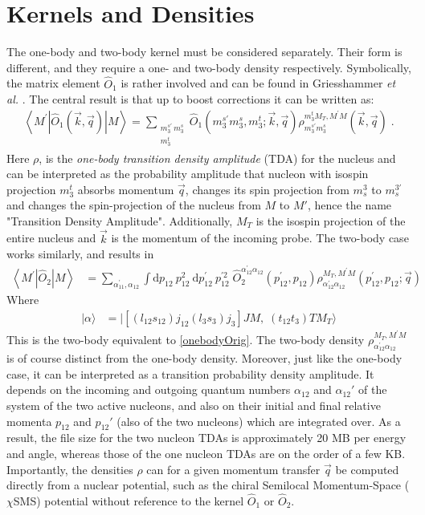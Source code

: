 \documentclass[a4paper,11pt]{article}
\newcommand{\etal}{\textit{et al.}}
\newcommand\bv[1]{\vec{#1}}
\begin{document}
\section{Kernels and Densities}
The one-body and two-body kernel must be considered separately.
Their form is different, and they require a one- and
two-body density respectively.
Symbolically, the matrix element $\hat{O}_1$ is rather involved and can be found in Griesshammer \etal 
\cite{hammer2020, hammer4He}.
The central result is that up to boost corrections it can
be written as:
\begin{align}
  \left\langle M^{\prime}\left|\hat{O}_{1}(\bv{k}, \bv{q})\right|
  M\right\rangle=\sum_{\substack{m_{3}^{s \prime}\,
  m_{3}^{s}\\m_3^t}}\hat{O}_{1}\left(m_{3}^{s \prime} m_{3}^{s},
  m_{3}^{t} ;  \bv{k}, \bv{q}\right) \rho_{m_{3}^{s \prime}
  m_{3}^{s}}^{m_3^{t} M_{T}, M^{\prime} M}(\bv{k}, \bv{q})\label{onebodyOrig}\;.
\end{align}
Here $\rho$, is the \textit{one-body transition density amplitude} (TDA)
for the nucleus and can be
interpreted as the probability amplitude that nucleon with isospin projection $m_3^t$ absorbs
momentum $\bv{q}$, changes its spin projection from $m_s^3$ to
$m_s^{3'}$ and changes the spin-projection of the nucleus from $M$ to
$M'$, hence the name "Transition Density Amplitude".
Additionally, $M_T$ is the isospin projection of the entire nucleus and $\vec{k}$ is the momentum of the incoming probe.
The two-body case works similarly, and results in
\begin{align}
  \left\langle M^{\prime}\left|\hat{O}_{2}\right| M\right\rangle &=
  \sum_{\alpha_{11}^{\prime}, \alpha_{12}} \int \mathrm{d} p_{12}\:
  p_{12}^{2} \mathrm{~d} p_{12}^{\prime}\: p_{12}^{\prime 2}\;
  \hat{O}_{2}^{\alpha_{12}^{\prime} \alpha_{12}}\left(p_{12}^{\prime},
  p_{12}\right) \rho_{\alpha_{12}^{\prime} \alpha_{12}}^{M_{T},
  M^{\prime} M}\left(p_{12}^{\prime}, p_{12} ; \bv{q}\right)\label{twobody}\;
\end{align}
Where
\begin{align}
   | \alpha \rangle & =|\left[(l_{12}s_{12})j_{12}(l_3 s_3)j_3\right] JM,\;(t_{12}t_3)TM_T\rangle
\end{align}
This is the two-body equivalent to \eqref{onebodyOrig}.
The two-body density $\rho_{\alpha_{12}^{\prime}
\alpha_{12}}^{M_{T}, M^{\prime} M}$ is of course distinct
from the one-body density.
Moreover, just like the one-body case, it can be interpreted as a
transition probability density amplitude.
It depends on the incoming and outgoing quantum numbers
$\alpha_{12}$ and $\alpha_{12}'$ of the system of the two active nucleons, and also on their initial and final
relative momenta $p_{12}$ and $p_{12}'$ (also of the two nucleons) which are integrated over.
As a result, the file size for the two nucleon TDAs is approximately 20 MB
per energy and angle, whereas those of the one
nucleon TDAs are on the order of a few KB.
Importantly, the densities $\rho$ can for a given momentum transfer $\vec{q}$ be computed directly from a nuclear
potential, such as the chiral Semilocal Momentum-Space ($\chi$SMS) potential
\cite{Reinert2018}
without reference to the kernel $\hat{O}_1$ or $\hat{O}_{2}$.
\end{document}
